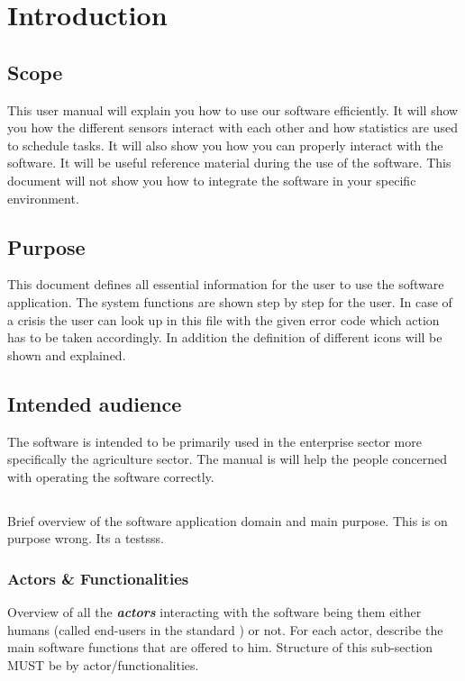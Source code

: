 \chapter{Introduction}
\label{chap:introduction}

\section{Scope}
This user manual will explain you how to use our software efficiently. It will
show you how the different sensors interact with each other and how statistics
are used to schedule tasks. It will also show you how you can properly interact
with the software. It will be useful reference material during the use of the
software. This document will not show you how to integrate the software in your specific environment.


\section{Purpose}
This document defines all essential information for the user to use the software application. 
The system functions are shown step by step for the user. In case of a crisis the user can look 
up in this file with the given error code which action has to be taken accordingly. 
In addition the definition of different icons will be shown and explained.



\section{Intended audience}
The software is intended to be primarily used in the enterprise sector more specifically the agriculture sector. The manual is will help the people concerned with operating the software correctly.

\section{\mysystemname}
Brief overview of the software application domain and main purpose.
This is on purpose wrong. Its a testsss.


\subsection{Actors \& Functionalities}
Overview of all the \textbf{\emph{\glspl{actor}}} interacting with the software
being them either humans (called end-users in the standard
\cite{IEEE-2001-userdocumentation}) or not. For each actor, describe the main
software functions that are offered to him. Structure of this sub-section MUST
be by actor/functionalities.


